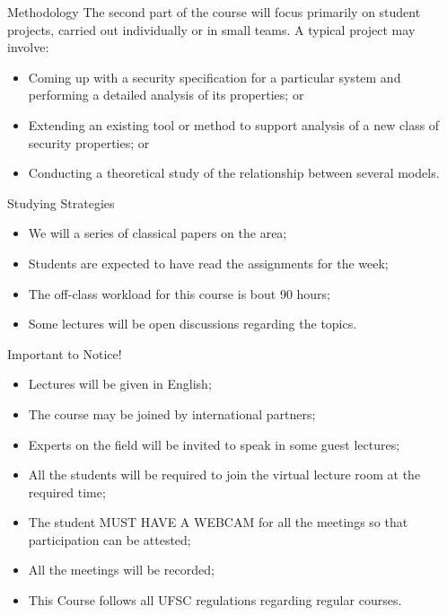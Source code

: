 \documentclass[12pt]{beamer}
\begin{document}
\begin{frame}{Methodology}
The second part of the course will focus primarily on student projects, carried out individually or in small teams. A typical project may involve:\pause
\begin{itemize}
\item Coming up with a security specification for a particular system and performing a detailed analysis of its properties; or\pause
\item Extending an existing tool or method to support analysis of a new class of security properties; or\pause
\item Conducting a theoretical study of the relationship between several models.
\end{itemize}
\end{frame}

\begin{frame}{Studying Strategies}
\begin{itemize}
\item We will a series of classical papers on the area;\pause
\item Students are expected to have read the assignments for the week;\pause
\item The off-class workload for this course is bout 90 hours;\pause
\item Some lectures will be open discussions regarding the topics.
\end{itemize}
\end{frame}

\begin{frame}{Important to Notice!}
\begin{itemize}
\item Lectures will be given in English;\pause
\item The course may be joined by international partners;\pause
\item Experts on the field will be invited to speak in some guest lectures;\pause
\item All the students will be required to join the virtual lecture room at the required time;\pause
\item The student MUST HAVE A WEBCAM for all the meetings so that participation can be attested;\pause
\item All the meetings will be recorded;\pause
\item This Course follows all UFSC regulations regarding regular courses.
\end{itemize}
\end{frame}
\end{document}
